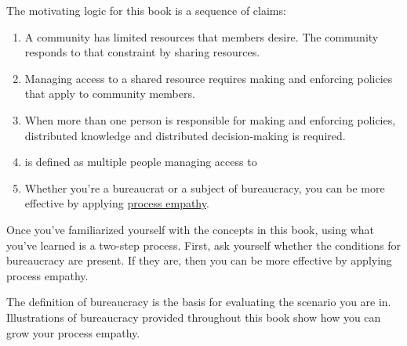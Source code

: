The motivating logic for this book is a sequence of claims:
\begin{enumerate}
    \item A community has limited resources that members desire. The community responds to that constraint by sharing resources.
    \item Managing access to a \gls{shared resource} 
    \iftoggle{glossaryinmargin}{\marginpar{[Glossary]}}{} requires making and enforcing policies that apply to community members. 
    \item When more than one person is responsible for making and enforcing policies, distributed knowledge and distributed decision-making is required. 
    \item 
\iftoggle{glossarysubstitutionworks}{\Gls{bureaucracy}}{Bureaucracy}
\iftoggle{glossaryinmargin}{\marginpar{[Glossary]}}{} is defined as multiple people managing access to 
\iftoggle{glossarysubstitutionworks}{\glspl{shared resource}.}{shared resources.} 
    \item Whether you're a \gls{bureaucrat} 
    \iftoggle{glossaryinmargin}{\marginpar{[Glossary]}}{} or a subject of bureaucracy, you can be more effective by applying \hyperref[sec:process-empathy]{process empathy}.
\end{enumerate}

Once you've familiarized yourself with the concepts in this book, using what you've learned is a two-step process. First, ask yourself whether the conditions for bureaucracy are present. If they are, then you can be more effective by applying process empathy.

The definition of bureaucracy is the basis for evaluating the scenario you are in. Illustrations of bureaucracy provided throughout this book show how you can grow your process empathy. 